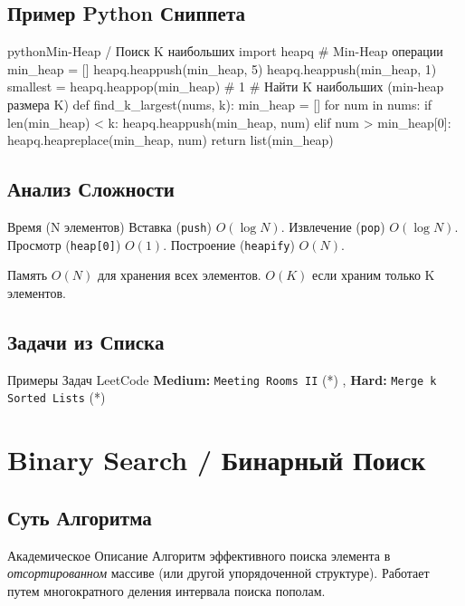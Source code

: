 \subsection{Пример Python Сниппета}
\begin{codebox}{python}{Min-Heap / Поиск K наибольших}
import heapq
# Min-Heap операции
min_heap = []
heapq.heappush(min_heap, 5)
heapq.heappush(min_heap, 1)
smallest = heapq.heappop(min_heap) # 1
# Найти K наибольших (min-heap размера K)
def find_k_largest(nums, k):
    min_heap = []
    for num in nums:
        if len(min_heap) < k:
            heapq.heappush(min_heap, num)
        elif num > min_heap[0]:
            heapq.heapreplace(min_heap, num)
    return list(min_heap)
\end{codebox}

\subsection{Анализ Сложности}
\begin{myblock}{Время (N элементов)}
    Вставка (\texttt{push}) $O(\log N)$. Извлечение (\texttt{pop}) $O(\log N)$. Просмотр (\texttt{heap[0]}) $O(1)$. Построение (\texttt{heapify}) $O(N)$.
\end{myblock}
\begin{myblock}{Память}
    $O(N)$ для хранения всех элементов. $O(K)$ если храним только K элементов.
\end{myblock}

\subsection{Задачи из Списка}
\begin{myblock}{Примеры Задач LeetCode}
    \textbf{Medium:} \texttt{Meeting Rooms II} (*) \sep
    \textbf{Hard:} \texttt{Merge k Sorted Lists} (*)
\end{myblock}

\section{Binary Search / Бинарный Поиск}

\subsection{Суть Алгоритма}
\begin{myblock}{Академическое Описание}
    Алгоритм эффективного поиска элемента в \emph{отсортированном} массиве (или другой упорядоченной структуре). Работает путем многократного деления интервала поиска пополам.
\end{myblock}

